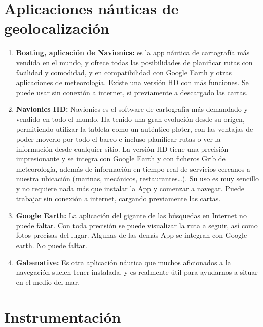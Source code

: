 \section{Aplicaciones náuticas de geolocalización}
\begin{enumerate}
\item \textbf{Boating, aplicación de Navionics:} es la app náutica de
  cartografía más vendida en el mundo, y ofrece todas las
  posibilidades de planificar rutas con facilidad y comodidad, y en
  compatibilidad con Google Earth y otras aplicaciones de
  meteorología. Existe una versión HD con más funciones. Se puede usar
  sin conexión a internet, si previamente a descargado las cartas.

\item \textbf{Navionics HD:} Navionics es el software de cartografía
  más demandado y vendido en todo el mundo. Ha tenido una gran
  evolución desde su origen, permitiendo utilizar la tableta como un
  auténtico ploter, con las ventajas de poder moverlo por todo el
  barco e incluso planificar rutas o ver la información desde
  cualquier sitio. La versión HD tiene una precisión impresionante y
  se integra con Google Earth y con ficheros Grib de meteorología,
  además de información en tiempo real de servicios cercanos a nuestra
  ubicación (marinas, mecánicos, restaurantes…). Su uso es muy
  sencillo y no requiere nada más que instalar la App y comenzar a
  navegar. Puede trabajar sin conexión a internet, cargando
  previamente las cartas.

\item \textbf{Google Earth:} La aplicación del gigante de las
  búsquedas en Internet no puede faltar. Con toda precisión se puede
  visualizar la ruta a seguir, así como fotos precisas del
  lugar. Algunas de las demás App se integran con Google earth. No
  puede faltar.
\item \textbf{Gabenative:} Es otra aplicación náutica que muchos
  aficionados a la navegación suelen tener instalada, y es realmente
  útil para ayudarnos a situar en el medio del mar.
\end{enumerate}

\section{Instrumentación}

